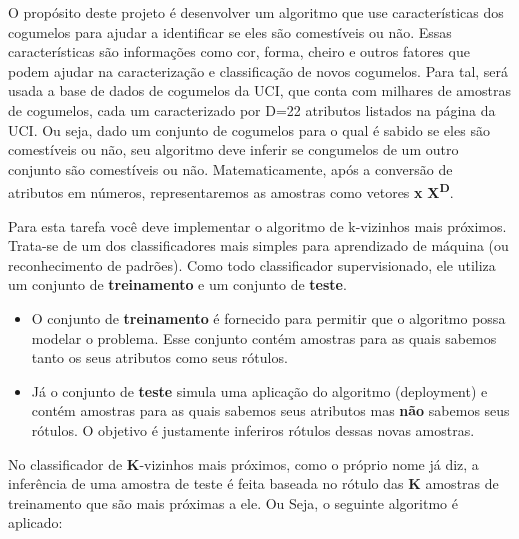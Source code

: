 \documentclass{article}
\date{\today}
\begin{document}
O propósito deste projeto é desenvolver um algoritmo que use características dos cogumelos para ajudar a identificar se eles são comestíveis ou não. Essas características são informações como cor, forma, cheiro e outros fatores que podem ajudar na caracterização e classificação de novos cogumelos. Para tal, será usada a base de dados de cogumelos da UCI, que conta com milhares de amostras de cogumelos, cada um caracterizado por D=22 atributos listados na página da UCI. Ou seja, dado um conjunto de cogumelos para o qual é sabido se eles são comestíveis ou não, seu algoritmo deve inferir se congumelos de um outro conjunto são comestíveis ou não. Matematicamente, após a conversão de atributos em números, representaremos as amostras como vetores \textbf{x} {\in} \textbf{{X\textsuperscript{D}}}.

\vspace{1.0cm}

Para esta tarefa você deve implementar o algoritmo de k-vizinhos mais próximos. Trata-se de um dos classificadores mais simples para aprendizado de máquina (ou reconhecimento de padrões). Como todo classificador supervisionado, ele utiliza um conjunto de \textbf{treinamento} e um conjunto de \textbf{teste}.

\begin{itemize}
\item  O conjunto de \textbf{treinamento} é fornecido para permitir que o algoritmo possa modelar o problema. Esse conjunto contém amostras para as quais sabemos tanto os seus atributos como seus rótulos.
\item Já o conjunto de \textbf{teste} simula uma aplicação do algoritmo (deployment) e contém amostras para as quais sabemos seus atributos mas \textbf{não} sabemos seus rótulos. O objetivo é justamente inferiros rótulos dessas novas amostras.
\end{itemize}

No classificador de \textbf{K}-vizinhos mais próximos, como o próprio nome já diz, a inferência de uma amostra de teste é feita baseada no rótulo das \textbf{K} amostras de treinamento que são mais próximas a ele. Ou Seja, o seguinte algoritmo é aplicado:
\end{document}
